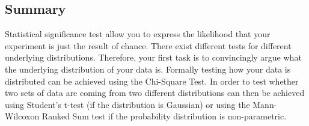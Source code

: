 \subsection{Summary}
Statistical significance test allow you to express the likelihood that your experiment is just the result of chance. There exist different tests for different underlying distributions. Therefore, your first task is to convincingly argue what the underlying distribution of your data is. Formally testing how your data is distributed can be achieved using the Chi-Square Test. In order to test whether two sets of data are coming from two different distributions can then be achieved using Student's t-test (if the distribution is Gaussian) or using the Mann-Wilcoxon Ranked Sum test if the probability distribution is non-parametric.
